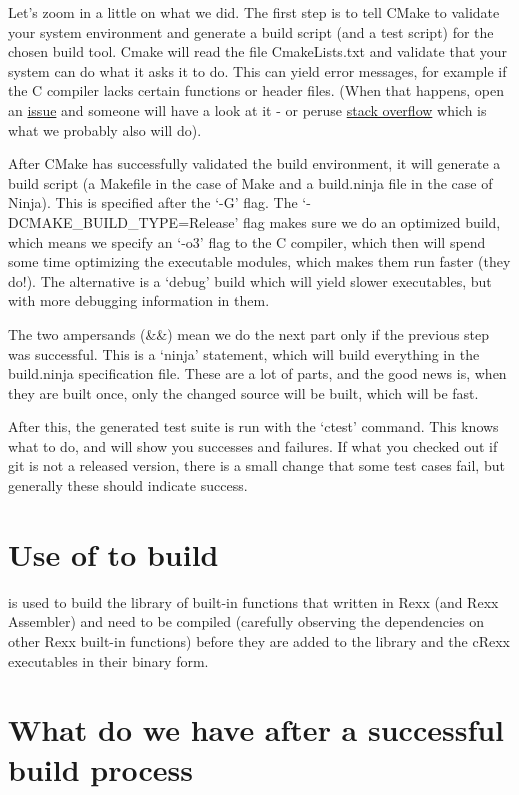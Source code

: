 Let's zoom in a little on what we did. The first step is to tell CMake
to validate your system environment and generate a build script (and a
test script) for the chosen build tool. Cmake will read the file
CmakeLists.txt and validate that your system can do what it asks it to
do. This can yield error messages, for example if the C compiler lacks
certain functions or header files. (When that happens, open an
\href{https://github.com/adesutherland/CREXX/issues}{issue} and someone
will have a look at it - or peruse
\href{https://stackoverflow.com}{stack overflow} which is what we
probably also will do).

After CMake has successfully validated the build environment, it will
generate a build script (a Makefile in the case of Make and a
build.ninja file in the case of Ninja). This is specified after the `-G'
flag. The `-DCMAKE\_BUILD\_TYPE=Release' flag makes sure we do an
optimized build, which means we specify an `-o3' flag to the C compiler,
which then will spend some time optimizing the executable modules, which
makes them run faster (they do!). The alternative is a `debug' build
which will yield slower executables, but with more debugging information
in them.

The two ampersands (\&\&) mean we do the next part only if the previous
step was successful. This is a `ninja' statement, which will build
everything in the build.ninja specification file. These are a lot of
parts, and the good news is, when they are built once, only the changed
source will be built, which will be fast.

After this, the generated test suite is run with the `ctest' command.
This knows what to do, and will show you successes and failures. If what
you checked out if git is not a released version, there is a small
change that some test cases fail, but generally these should indicate
success.

\hypertarget{use-of-rexx-to-build-crexx}{%
\section{Use of \crexx{} to build \crexx{}}\label{use-of-rexx-to-build-crexx}}

\crexx{} is used to build the library of built-in functions that written in Rexx (and Rexx
Assembler) and need to be compiled (carefully observing the
dependencies on other Rexx built-in functions) before they are added to the
library and the cRexx executables in their binary form.

\hypertarget{what-do-we-have-after-a-successful-build-process}{%
\section{What do we have after a successful build
process}\label{what-do-we-have-after-a-successful-build-process}}

